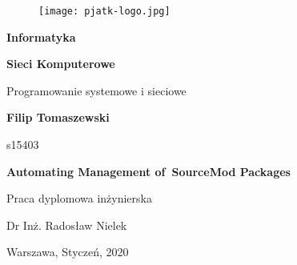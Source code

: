 \thispagestyle{empty}

\begin{figure}[H]
  \centering
  \texttt{[image: pjatk-logo.jpg]}
\end{figure}

\begin{center}

{\large \textbf{Informatyka}}

\vspace{1cm}

{\large \textbf{Sieci Komputerowe}}

\vspace{0.25cm}

Programowanie systemowe i sieciowe

\vspace{2cm}

{\large \textbf{Filip Tomaszewski}}

s15403

\vspace{1.5cm}

{\LARGE \textbf{Automating Management of~SourceMod Packages}}

\vspace{2cm}

\begin{flushright}

Praca dyplomowa inżynierska

Dr Inż. Radosław Nielek

\end{flushright}

\vspace{\fill}

Warszawa, Styczeń, 2020

\end{center}

\newpage
{}
\setcounter{page}{1}
